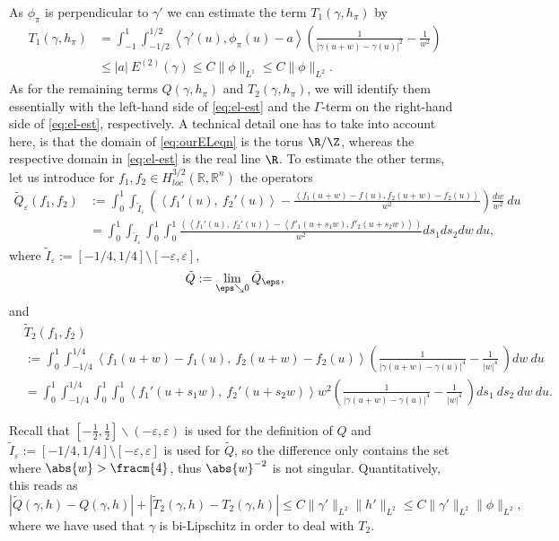 As $\phi_\pi$ is perpendicular to $\gamma'$ we can estimate the term $T_1(\gamma,h_\pi)$
by
\begin{align}
 T_1(\gamma,h_\pi) &= \int_{-1}^1 \int_{-1/2}^{1/2}
   \left\langle \gamma'(u),\phi_\pi(u) - a \right\rangle 
  \left(\frac 1 {|\gamma(u+w)- \gamma(u)|^2} - \frac 1 {w^2} \right)\nonumber\\
  &\leq |a|\ E^{(2)}(\gamma) \leq C \|\phi\|_{L^1} \leq C \|\phi\|_{L^2}.\label{eq:toRT1}
\end{align}
As for the remaining terms $Q(\gamma,h_\pi)$ and $T_2(\gamma,h_\pi)$, we will identify them essentially with the left-hand side of \eqref{eq:el-est} and the $\Gamma$-term on the right-hand side of \eqref{eq:el-est}, respectively. 
A technical detail one has to take into account here, is that the domain of \eqref{eq:ourELeqn} is the torus $\R / \Z$, whereas the respective domain in \eqref{eq:el-est} is the real line $\R$.
To estimate the other terms, let us introduce for 
$f_1, f_2 \in H^{3/2}_{loc}(\mathbb R, \mathbb R^n)$
the operators
\begin{align*}
 \tilde{Q}_\varepsilon (f_1,f_2)& :=  
 \int_{0}^{1}\int_{\tilde I_\varepsilon}
  \left(\left\langle f_1'(u),\ f_2'(u) \right\rangle -
  \frac { \left\langle f_1(u+w)-f(u), f_2(u+w) -f_2(u) 
  \right\rangle}{w^2} \right) \frac {dw}{w^2}\ du\\
& = \int_{0}^{1}\int_{\tilde I_\varepsilon} \int_0^1 \int_0^1
  \frac {\left( \left\langle f_1'(u),\ f_2'(u) \right\rangle- \left\langle f'_1(u+s_1w), f'_2(u+s_2w)
  \right\rangle	\right) }{w^2} ds_1 ds_2 dw\ du,
\end{align*}
where $\tilde I_\varepsilon := [-1/4, 1/4]\setminus [-\varepsilon, \varepsilon]$,
\[ \tilde Q := \lim_{\eps\searrow0} \tilde Q_\eps, \]
and
\begin{equation}
\begin{aligned}
 &\tilde {T}_2(f_1,f_2) \\ &:=  \int_{0}^{1}\int_{-1/4}^{1/4}
  \left\langle f_1(u+w)-f_1(u),\ f_2(u+w)-f_2(u) \right\rangle \left(\frac 1  {|\gamma(u+w)-\gamma(u)|^4}-
 \frac1{|w|^4}\ \right) dw\ du \\
&= \int_{0}^{1}\int_{-1/4}^{1/4} \int_0^1 \int_0^1 
  \left\langle f_1'(u+s_1 w),\ f_2'(u+s_2 w) \right\rangle w^2\left( \frac 1 {|\gamma(u+w)-\gamma(u)|^4}
- \frac1{|w|^4}\ \right) ds_1\ ds_2\ dw\ du.
\end{aligned}
\end{equation}

Recall that $[-\frac{1}{2},\frac{1}{2}]\backslash (-\varepsilon,\varepsilon)$ is used for the definition of $Q$ %
and $\tilde I_\varepsilon := [-1/4, 1/4]\setminus [-\varepsilon, \varepsilon]$ is used for $\tilde{Q}$, %
so the difference only contains the set where $\abs{w} > \fracm{4}$, thus $\abs{w}^{-2}$ is not singular. Quantitatively, this reads as
\begin{equation} \label{eq:toRtilde}
 |\tilde Q(\gamma,h) - Q(\gamma,h)| + |\tilde T_2 (\gamma,h) - T_2(\gamma,h)| 
\leq C \|\gamma'\|_{L^2} \|h'\|_{L^2} \leq C \|\gamma'\|_{L^2} \|\phi\|_{L^2},
\end{equation}
where we have used that $\gamma$ is bi-Lipschitz in order to deal with $T_2$.

